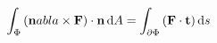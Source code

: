 \begin{mydef}
    \label{mydef:10.49}
    
\end{mydef}

\begin{mydef}
    \label{mydef:10.50}
    
    \begin{equation}
        \label{eq:10.145}
        \int_{\Phi} \left( \mathbf{n}abla \times \mathbf{F} \right) \cdot \mathbf{n} \d A = 
        \int_{\partial \Phi} \left( \mathbf{F \cdot t} \right)  \d s
    \end{equation}
\end{mydef}

\begin{mydef}
    \label{mydef:10.51}
    
\end{mydef}

